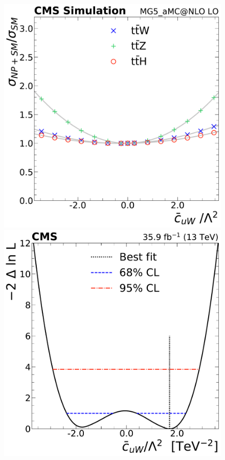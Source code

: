 \begin{landscape}
\begin{figure}
{        \includegraphics[height=\textheight]{figures/thirteen-TeV/NP/mu/cuW}\hspace{1cm}
        \includegraphics[height=\textheight]{figures/thirteen-TeV/NP/nll/cuW}\hspace{1cm}
}
\end{figure}
\end{landscape}
